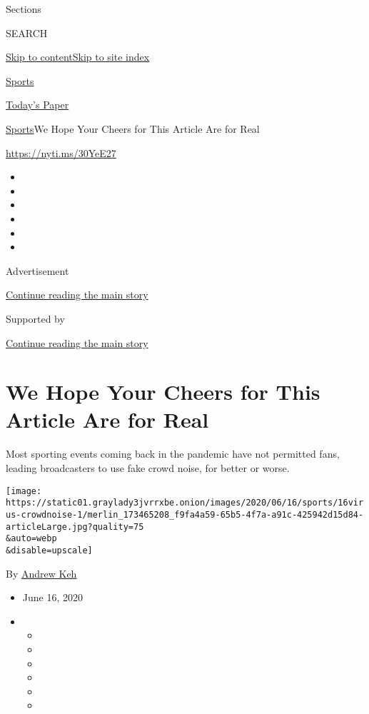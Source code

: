 Sections

SEARCH

\protect\hyperlink{site-content}{Skip to
content}\protect\hyperlink{site-index}{Skip to site index}

\href{https://www.nytimes3xbfgragh.onion/section/sports}{Sports}

\href{https://myaccount.nytimes3xbfgragh.onion/auth/login?response_type=cookie\&client_id=vi}{}

\href{https://www.nytimes3xbfgragh.onion/section/todayspaper}{Today's
Paper}

\href{/section/sports}{Sports}\textbar{}We Hope Your Cheers for This
Article Are for Real

\url{https://nyti.ms/30YeE27}

\begin{itemize}
\item
\item
\item
\item
\item
\item
\end{itemize}

Advertisement

\protect\hyperlink{after-top}{Continue reading the main story}

Supported by

\protect\hyperlink{after-sponsor}{Continue reading the main story}

\hypertarget{we-hope-your-cheers-for-this-article-are-for-real}{%
\section{We Hope Your Cheers for This Article Are for
Real}\label{we-hope-your-cheers-for-this-article-are-for-real}}

Most sporting events coming back in the pandemic have not permitted
fans, leading broadcasters to use fake crowd noise, for better or worse.

\texttt{[image: https://static01.graylady3jvrrxbe.onion/images/2020/06/16/sports/16virus-crowdnoise-1/merlin\_173465208\_f9fa4a59-65b5-4f7a-a91c-425942d15d84-articleLarge.jpg?quality=75\\\&auto=webp\\\&disable=upscale]}

By \href{https://www.nytimes3xbfgragh.onion/by/andrew-keh}{Andrew Keh}

\begin{itemize}
\item
  June 16, 2020
\item
  \begin{itemize}
  \item
  \item
  \item
  \item
  \item
  \item
  \end{itemize}
\end{itemize}

